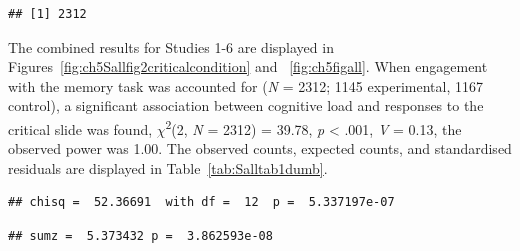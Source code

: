 \documentclass[
  american,
  man,floatsintext]{apa7}
\begin{document}
\begin{verbatim}
## [1] 2312
\end{verbatim}

The combined results for Studies 1-6 are displayed in Figures~\ref{fig:ch5Sallfig2criticalcondition} and ~\ref{fig:ch5figall}. When engagement with the memory task was accounted for (\emph{N} = 2312; 1145 experimental, 1167 control), a significant association between cognitive load and responses to the critical slide was found, \(\chi\)\textsuperscript{2}(2, \emph{N} = 2312) = 39.78, \emph{p} \textless{} .001, \emph{V} = 0.13, the observed power was 1.00. The observed counts, expected counts, and standardised residuals are displayed in Table~\ref{tab:Salltab1dumb}.

\begin{verbatim}
## chisq =  52.36691  with df =  12  p =  5.337197e-07
\end{verbatim}

\begin{verbatim}
## sumz =  5.373432 p =  3.862593e-08
\end{verbatim}
\end{document}
